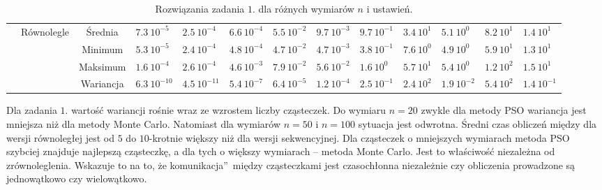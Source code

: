 \documentclass[11pt, a4paper, oneside]{article}
\begin{document}
\begin{table}[h]
\begin{adjustwidth}{-1.76cm}{}
\begin{tabular}{|c|c|c|l|l|l|l|l|l|l|l|l|l|}
                      & \multirow{4}{*}{Równolegle}   & Średnia   & $7.3 \ 10^{-5}$          & $2.5 \ 10^{-4}$         & $6.6 \ 10^{-4}$          & $5.5 \ 10^{-2}$         & $9.7 \ 10^{-3}$          & $9.7 \ 10^{-1}$         & $3.4 \ 10^{1}$           & $5.1 \ 10^{0}$          & $8.2 \ 10^{1}$           & $1.4 \ 10^{1}$          \\ \cline{3-13} 
                      &                               & Minimum   & $5.3 \ 10^{-5}$          & $2.4 \ 10^{-4}$         & $4.8 \ 10^{-4}$          & $4.7 \ 10^{-2}$         & $4.7 \ 10^{-3}$          & $3.8 \ 10^{-1}$         & $7.6 \ 10^{0}$           & $4.9 \ 10^{0}$          & $5.9 \ 10^{1}$           & $1.3 \ 10^{1}$          \\ \cline{3-13} 
                      &                               & Maksimum  & $1.6 \ 10^{-4}$          & $2.6 \ 10^{-4}$         & $4.6 \ 10^{-3}$          & $7.9 \ 10^{-2}$         & $5.6 \ 10^{-2}$          & $1.6 \ 10^{0}$          & $5.7 \ 10^{1}$           & $5.4 \ 10^{0}$          & $1.2 \ 10^{2}$           & $1.5 \ 10^{1}$          \\ \cline{3-13} 
                      &                               & Wariancja & $6.3 \ 10^{-10}$         & $4.5 \ 10^{-11}$        & $5.4 \ 10^{-7}$          & $6.4 \ 10^{-5}$         & $1.2 \ 10^{-4}$          & $2.5 \ 10^{-1}$         & $2.4 \ 10^{2}$           & $1.9 \ 10^{-2}$         & $5.4 \ 10^{2}$           & $1.4 \ 10^{-1}$         \\ \hline
\end{tabular}
\end{adjustwidth}
\caption{Rozwiązania zadania $1$. dla różnych wymiarów $n$ i ustawień.}
\label{tab:rozw_zad1}
\end{table}

Dla zadania $1$. wartość wariancji rośnie wraz ze wzrostem liczby cząsteczek. Do wymiaru $n = 20$ zwykle dla metody PSO wariancja jest mniejsza niż dla metody Monte Carlo. Natomiast dla wymiarów $n = 50$ i $n = 100$ sytuacja jest odwrotna. Średni czas obliczeń między dla wersji równoległej jest od $5$ do $10$-krotnie większy niż dla wersji sekwencyjnej. Dla cząsteczek o mniejszych wymiarach metoda PSO szybciej znajduje najlepszą cząsteczkę, a dla tych o większy wymiarach -- metoda Monte Carlo. Jest to właściwość niezależna od zrównoleglenia. Wskazuje to na to, że \quotedblbase komunikacja\textquotedblright \ między cząsteczkami jest czasochłonna niezależnie czy obliczenia prowadzone są jednowątkowo czy wielowątkowo.
\end{document}
